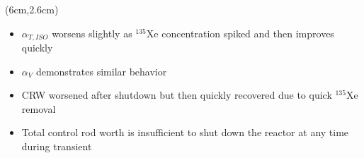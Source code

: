 \begin{frame}
\begin{textblock*}{12.5cm}
\begin{columns}
		\column[t]{6cm}
		\begin{textblock*}{6.7cm}(6cm,2.6cm) %
			\begin{itemize}
				\itemsep=0.8em
				\item<1-> $\alpha_{T,ISO}$ worsens slightly as $^{135}$Xe 
				concentration spiked and then improves quickly
				\item<2-> $\alpha_V$ demonstrates similar behavior
				\item<3-> CRW worsened after shutdown but then quickly 
				recovered due to quick $^{135}$Xe removal
				\item<4-> Total control rod worth is insufficient to shut down 
				the reactor at any time during transient
			\end{itemize}
			
		\end{textblock*}
	\end{columns}
\end{textblock*}
\end{frame}
